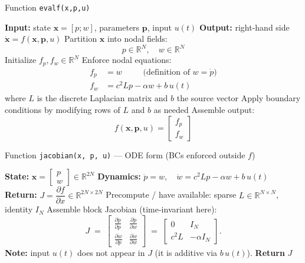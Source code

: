 \documentclass[11pt]{article}
\begin{document}
\begin{algorithm}[h]
\caption{Function \texttt{evalf(x,p,u)}}
\begin{algorithmic}[1]
\State \textbf{Input:} state $\mathbf{x} = [p;w]$, parameters $\mathbf{p}$, input $u(t)$
\State \textbf{Output:} right-hand side $\dot{\mathbf{x}} = f(\mathbf{x},\mathbf{p},u)$
\vspace{6pt}
\State Partition $\mathbf{x}$ into nodal fields:
\[
p \in \mathbb{R}^N, \quad w \in \mathbb{R}^N
\]
\State Initialize $f_p, f_w \in \mathbb{R}^N$
\State Enforce nodal equations:
\begin{align*}
f_p &= w \qquad \;\; \text{(definition of $w=\dot p$)} \\
f_w &= c^2 L p - \alpha w + b\,u(t)
\end{align*}
where $L$ is the discrete Laplacian matrix and $b$ the source vector
\State Apply boundary conditions by modifying rows of $L$ and $b$ as needed
\State Assemble output:
\[
f(\mathbf{x},\mathbf{p},u) =
\begin{bmatrix}
f_p \\ f_w
\end{bmatrix}
\]
\end{algorithmic}
\end{algorithm}

\begin{algorithm}[h]
\caption{Function \texttt{jacobian(x, p, u)} — ODE form (BCs enforced outside $f$)}
\begin{algorithmic}[1]
\State \textbf{State:} $\mathbf{x}=\begin{bmatrix}p\\ w\end{bmatrix}\in\mathbb{R}^{2N}$ \quad
\textbf{Dynamics:}\quad
$\dot p = w,\quad \dot w = c^2 L p - \alpha w + b\,u(t)$
\State \textbf{Return:} $J=\dfrac{\partial f}{\partial x}\in\mathbb{R}^{2N\times 2N}$
\vspace{4pt}
\State Precompute / have available: sparse $L\in\mathbb{R}^{N\times N}$, identity $I_N$
\State Assemble block Jacobian (time-invariant here):
\[
J \;=\;
\begin{bmatrix}
\frac{\partial \dot p}{\partial p} & \frac{\partial \dot p}{\partial w}\\[2pt]
\frac{\partial \dot w}{\partial p} & \frac{\partial \dot w}{\partial w}
\end{bmatrix}
\;=\;
\begin{bmatrix}
0 & I_N\\[2pt]
c^2 L & -\alpha I_N
\end{bmatrix}.
\]
\State \textbf{Note:} input $u(t)$ does not appear in $J$ (it is additive via $b\,u(t)$).
\State \textbf{Return} $J$
\end{algorithmic}
\end{algorithm}
\end{document}
